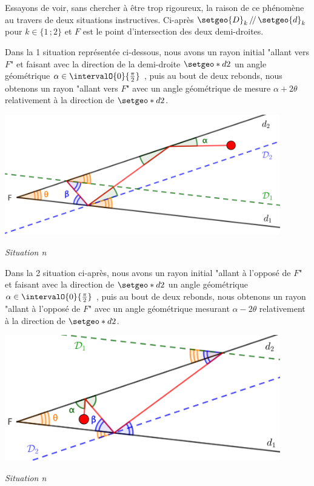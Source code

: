 Essayons de voir, sans chercher à être trop rigoureux, la raison de ce phénomène au travers de deux situations instructives. Ci-après $\setgeo{D}_k \, /\!/ \, \setgeo{d}_k$ pour $k \in \{ 1 \,; 2\}$ et $F$ est le point d'intersection des deux demi-droites.


\medskip


Dans la 1\iere{} situation représentée ci-dessous, nous avons un rayon initial "allant vers $F$" et faisant avec la direction de la demi-droite $\setgeo*{d}{2}$ un angle géométrique $\alpha \in \intervalO{0}{\frac{\pi}{2}}$ , puis au bout de deux rebonds, nous obtenons un rayon "allant vers $F$" avec un angle géométrique de mesure $\alpha + 2\theta$ relativement à la direction de $\setgeo*{d}{2}$.


\medskip


\begin{center}
	\includegraphics[width=12cm]{basic-math-pool/analysis-1.png}
	
	\itshape\small
	Situation n
	\label{situtation-1}
\end{center}


\medskip


Dans la 2\ieme{} situation ci-après, nous avons un rayon initial "allant à l'opposé de $F$" et faisant  avec la direction de $\setgeo*{d}{2}$ un angle géométrique $\alpha \in \intervalO{0}{\frac{\pi}{2}}$ , puis au bout de deux rebonds, nous obtenons un rayon "allant à l'opposé de $F$" avec un angle géométrique mesurant $\alpha - 2\theta$ relativement à la direction de $\setgeo*{d}{2}$.


\medskip


\begin{center}
	\includegraphics[width=12cm]{basic-math-pool/analysis-2.png}
	
	\itshape\small
	Situation n
	\label{situtation-2}
\end{center}


